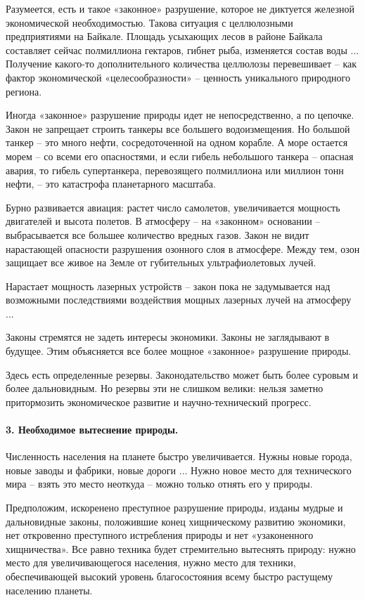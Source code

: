 \documentclass[11pt,a4paper]{article}
\begin{document}
Разумеется, есть и такое «законное» разрушение, которое не диктуется железной
экономической необходимостью. Такова ситуация с целлюлозными предприятиями на
Байкале. Площадь усыхающих лесов в районе Байкала составляет сейчас
полмиллиона гектаров, гибнет рыба, изменяется состав воды ... Получение
какого-то дополнительного количества целлюлозы перевешивает -- как фактор
экономической «целесообразности» -- ценность уникального природного региона.

Иногда «законное» разрушение природы идет не непосредственно, а по цепочке.
Закон не запрещает строить танкеры все большего водоизмещения. Но большой
танкер -- это много нефти, сосредоточенной на одном корабле. А море остается
морем -- со всеми его опасностями, и если гибель небольшого танкера -- опасная
авария, то гибель супертанкера, перевозящего полмиллиона или миллион тонн
нефти, -- это катастрофа планетарного масштаба.

Бурно развивается авиация: растет число самолетов, увеличивается мощность
двигателей и высота полетов. В атмосферу -- на «законном» основании --
выбрасывается все большее количество вредных газов. Закон не видит нарастающей
опасности разрушения озонного слоя в атмосфере. Между тем, озон защищает все
живое на Земле от губительных ультрафиолетовых лучей.

Нарастает мощность лазерных устройств -- закон пока не задумывается над
возможными последствиями воздействия мощных лазерных лучей на атмосферу ...

Законы стремятся не задеть интересы экономики. Законы не заглядывают в
будущее. Этим объясняется все более мощное «законное» разрушение природы.

Здесь есть определенные резервы. Законодательство может быть более суровым и
более дальновидным. Но резервы эти не слишком велики: нельзя заметно
притормозить экономическое развитие и научно-технический прогресс.

\paragraph{3. Необходимое вытеснение природы.}
Численность населения на планете быстро увеличивается. Нужны новые города,
новые заводы и фабрики, новые дороги ... Нужно новое место для технического
мира -- взять это место неоткуда -- можно только отнять его у природы.

Предположим, искоренено преступное разрушение природы, изданы мудрые и
дальновидные законы, положившие конец хищническому развитию экономики, нет
откровенно преступного истребления природы и нет «узаконенного хищничества».
Все равно техника будет стремительно вытеснять природу: нужно место для
увеличивающегося населения, нужно место для техники, обеспечивающей высокий
уровень благосостояния всему быстро растущему населению планеты.
\end{document}
